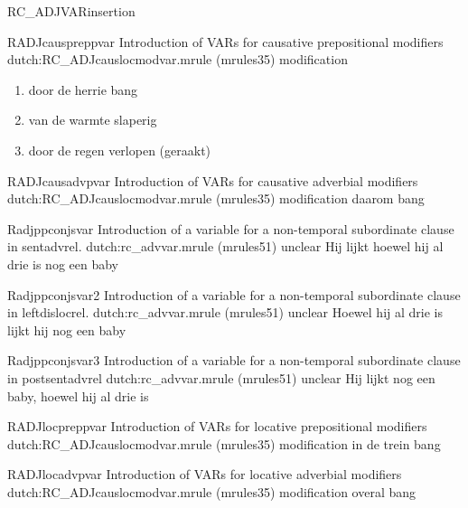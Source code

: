 \begin{mruleclass}{RC\_ADJVARinsertion}
\begin{members}
\begin{member}
\end{member}
\begin{member}
 RADJcauspreppvar 
 Introduction of VARs for causative prepositional modifiers 
\file dutch:RC\_ADJcauslocmodvar.mrule (mrules35)
\semantics modification
\example\mbox{}
\begin{enumerate}
  \item 
door de herrie bang 
  \item
van de warmte slaperig
  \item 
door de regen verlopen (geraakt)
\end{enumerate}
\remarks\mbox{}

\end{member}
\begin{member}
 RADJcausadvpvar
 Introduction of VARs for causative adverbial modifiers 
\file dutch:RC\_ADJcauslocmodvar.mrule (mrules35)
\semantics modification
\example daarom bang 
\remarks\mbox{}

\end{member}
\begin{member}
 Radjppconjsvar
 Introduction of a variable for a non-temporal subordinate clause in 
sentadvrel.
\file dutch:rc\_advvar.mrule (mrules51)
\semantics unclear
\example Hij lijkt hoewel hij al drie is nog een baby 

\remarks\mbox{}

\end{member}
\begin{member}
 Radjppconjsvar2
 Introduction of a variable for a non-temporal 
subordinate clause 
in 
leftdislocrel.
\file dutch:rc\_advvar.mrule (mrules51)
\semantics unclear
\example Hoewel hij al drie is lijkt hij nog een baby 

\remarks\mbox{}

\end{member}
\begin{member}
 Radjppconjsvar3
 Introduction of a variable for a 
non-temporal subordinate clause in postsentadvrel
\file dutch:rc\_advvar.mrule (mrules51)
\semantics unclear
\example Hij lijkt nog een baby, hoewel hij al drie is 

\remarks\mbox{}

\end{member}

\begin{member}
 RADJlocpreppvar 
 Introduction of VARs for locative prepositional modifiers 
\file dutch:RC\_ADJcauslocmodvar.mrule (mrules35)
\semantics modification
\example in de trein bang 
\remarks\mbox{}

\end{member}
\begin{member}
 RADJlocadvpvar
 Introduction of VARs for locative adverbial modifiers 
\file dutch:RC\_ADJcauslocmodvar.mrule (mrules35)
\semantics modification
\example overal bang 
\remarks\mbox{}

\end{member}
\end{members}

\end{mruleclass}
